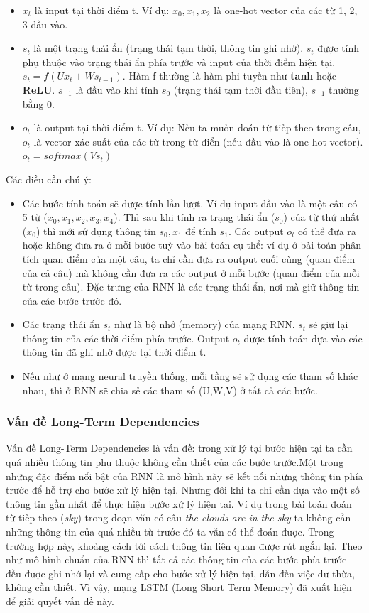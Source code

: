 \documentclass[a4paper,12pt]{report}
\begin{document}
\begin{itemize}
\item $x_t$ là input tại thời điểm t. Ví dụ: $x_0, x_1, x_2$ là one-hot vector của các từ 1, 2, 3 đầu vào.
\item $s_t$ là một trạng thái ẩn (trạng thái tạm thời, thông tin ghi nhớ). $s_t$ được tính phụ thuộc vào trạng thái ẩn phía trước và input của thời điểm hiện tại. $s_t = f(Ux_t + Ws_{t-1})$. Hàm f thường là hàm phi tuyến như \textbf{tanh} hoặc \textbf{ReLU}. $s_{-1}$ là đầu vào khi tính $s_0$ (trạng thái tạm thời đầu tiên), $s_{-1}$ thường bằng 0.
\item $o_t$ là output tại thời điểm t. Ví dụ: Nếu ta muốn đoán từ tiếp theo trong câu, $o_t$ là vector xác suất của các từ trong từ điển (nếu đầu vào là one-hot vector). $o_t = softmax(Vs_t)$
\end{itemize}
Các điều cần chú ý:
\begin{itemize}
\item Các bước tính toán sẽ được tính lần lượt. Ví dụ input đầu vào là một câu có 5 từ ($x_0, x_1, x_2, x_3, x_4$). Thì sau khi tính ra trạng thái ẩn ($s_0$) của từ thứ nhất ($x_0$) thì mới sử dụng thông tin $s_0, x_1$ để tính $s_1$. Các output $o_t$ có thể đưa ra hoặc không đưa ra ở mỗi bước tuỳ vào bài toán cụ thể: ví dụ ở bài toán phân tích quan điểm của một câu, ta chỉ cần đưa ra output cuối cùng (quan điểm của cả câu) mà không cần đưa ra các output ở mỗi bước (quan điểm của mỗi từ trong câu). Đặc trưng của RNN là các trạng thái ẩn, nơi mà giữ thông tin của các bước trước đó.  
\item Các trạng thái ẩn $s_t$ như là bộ nhớ (memory) của mạng RNN. $s_t$ sẽ giữ lại thông tin của các thời điểm phía trước. Output $o_t$ được tính toán dựa vào các thông tin đã ghi nhớ được tại thời điểm t.
\item Nếu như ở mạng neural truyền thống, mỗi tầng sẽ sử dụng các tham số khác nhau, thì ở RNN sẽ chia sẻ các tham số (U,W,V) ở tất cả các bước.
\end{itemize}

\subsubsection{Vấn đề Long-Term Dependencies}
Vấn đề  Long-Term Dependencies là vấn đề: trong xử lý tại bước hiện tại ta cần quá nhiều thông tin phụ thuộc không cần thiết của các bước trước.Một trong những đặc điểm nổi bật của RNN là mô hình này sẽ kết nối những thông tin phía trước để hỗ trợ cho bước xử lý hiện tại. Nhưng đôi khi ta chỉ cần dựa vào một số thông tin gần nhất để thực hiện bước xử lý hiện tại. Ví dụ trong bài toán đoán từ tiếp theo (\emph{sky}) trong đoạn văn có câu \emph{the clouds are in the sky} ta không cần những thông tin của quá nhiều từ trước đó ta vẫn có thể đoán được. Trong trường hợp này, khoảng cách tới cách thông tin liên quan được rút ngắn lại. Theo như mô hình chuẩn của RNN thì tất cả các thông tin của các bước phía trước đều được ghi nhớ lại và cung cấp cho bước xử lý hiện tại, dẫn đến việc dư thừa, không cần thiết. Vì vậy, mạng LSTM (Long Short Term Memory) đã xuất hiện để giải quyết vấn đề này.
\end{document}
